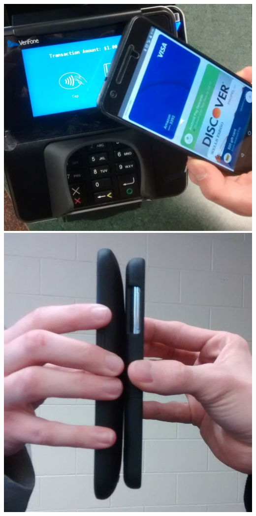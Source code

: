 \documentclass[unknownkeysallowed]{beamer}
\begin{document}
\begin{frame}
\begin{block}{}
\begin{center}
        \includegraphics[width=\linewidth,height=0.27\textheight,keepaspectratio]{figures/androidPay.png}
        \includegraphics[width=\linewidth,height=0.27\textheight,keepaspectratio]{figures/peer.jpg}

\end{center}
\end{block}
\end{frame}
\end{document}
